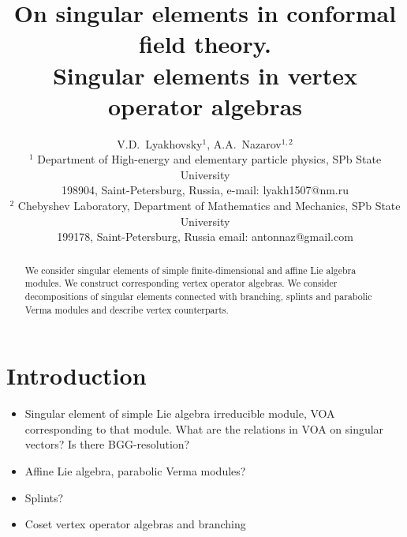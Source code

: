 \documentclass[12pt]{article}
\begin{document}
\title{On singular elements in conformal field theory. \\ Singular elements in vertex operator algebras}



\author{V.D.~Lyakhovsky$^1$, A.A.~Nazarov$^{1,2}$ \\
  {\small $^1$ Department of High-energy and elementary particle physics, SPb State University}\\
  {\small 198904, Saint-Petersburg, Russia,}
  {\small e-mail: lyakh1507@nm.ru}\\
  {\small$^{2}$ Chebyshev Laboratory,}
  {\small Department of Mathematics and Mechanics, SPb State University}\\
  {\small 199178, Saint-Petersburg, Russia}
  {\small email: antonnaz@gmail.com}}
\date{}
\maketitle

\begin{abstract}
  We consider singular elements of simple finite-dimensional and affine Lie algebra modules. We
  construct corresponding vertex operator algebras. We consider decompositions of singular elements
  connected with branching, splints and parabolic Verma modules and describe vertex counterparts. 
\end{abstract}

\section{Introduction}
\begin{itemize}
\item Singular element of simple Lie algebra irreducible module, VOA corresponding to that module.
  What are the relations in VOA on singular vectors? Is there BGG-resolution?
\item Affine Lie algebra, parabolic Verma modules?
\item Splints?
\item Coset vertex operator algebras and branching
\end{itemize}
\end{document}
